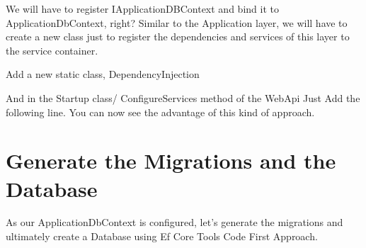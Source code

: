 \documentclass[letterpaper,10pt,english]{sphinxmanual}
\begin{document}
We will have to register IApplicationDBContext and bind it to ApplicationDbContext, right? Similar to the Application layer, we will have to create a new class just to register the dependencies and services of this layer to the service container.

Add a new static class, DependencyInjection

\begin{sphinxVerbatim}[commandchars=\\\{\}]
   
           
         
                  
          
\end{sphinxVerbatim}

And in the Startup class/ ConfigureServices method of the WebApi Just Add the following line. You can now see the advantage of this kind of approach.

\begin{sphinxVerbatim}[commandchars=\\\{\}]
\end{sphinxVerbatim}


\section{Generate the Migrations and the Database}
\label{\detokenize{OnionArchitecture/details:generate-the-migrations-and-the-database}}
As our ApplicationDbContext is configured, let’s generate the migrations and ultimately create a Database using Ef Core Tools \textendash{} Code First Approach.
\end{document}
